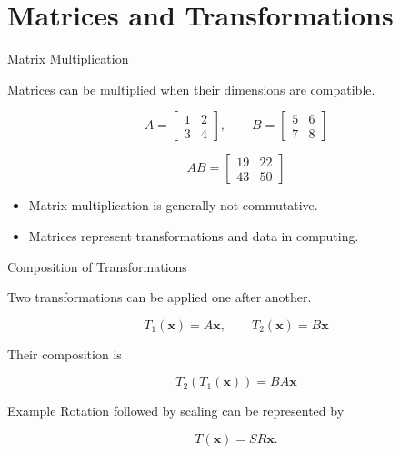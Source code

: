 \documentclass[aspectratio=169]{beamer}
\begin{document}
\section{Matrices and Transformations}

\begin{frame}{Matrix Multiplication}
\small

Matrices can be multiplied when their dimensions are compatible.

$$
A=
\begin{bmatrix}
1&2\\
3&4
\end{bmatrix},
\qquad
B=
\begin{bmatrix}
5&6\\
7&8
\end{bmatrix}
$$

$$
AB=
\begin{bmatrix}
19&22\\
43&50
\end{bmatrix}
$$

\begin{itemize}
\item Matrix multiplication is generally not commutative.
\item Matrices represent transformations and data in computing.
\end{itemize}

\end{frame}

\begin{frame}{Composition of Transformations}
\small

Two transformations can be applied one after another.

$$
T_1(\mathbf{x})=A\mathbf{x},
\qquad
T_2(\mathbf{x})=B\mathbf{x}
$$

Their composition is

$$
T_2(T_1(\mathbf{x}))=BA\mathbf{x}
$$

\begin{block}{Example}
Rotation followed by scaling can be represented by

$$
T(\mathbf{x})=SR\mathbf{x}.
$$

\end{block}

\end{frame}
\end{document}
